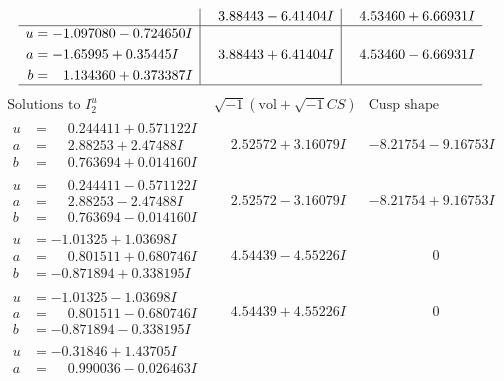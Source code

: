 \documentclass[1p]{elsarticle_modified}
\theoremstyle{definition}
\newcommand{\I}{\sqrt{-1}}
\begin{document}
$$\begin{array}{c|c|c}
 & \phantom{-}3.88443 - 6.41404 I & \phantom{-}4.53460 + 6.66931 I \\ \hline\begin{aligned}
u &= -1.097080 - 0.724650 I \\
a &= -1.65995 + 0.35445 I \\
b &= \phantom{-}1.134360 + 0.373387 I\end{aligned}
 & \phantom{-}3.88443 + 6.41404 I & \phantom{-}4.53460 - 6.66931 I\\
 \hline 
 \end{array}$$\newpage$$\begin{array}{c|c|c}  
\text{Solutions to }I^u_{2}& \I (\text{vol} + \sqrt{-1}CS) & \text{Cusp shape}\\
 \hline 
\begin{aligned}
u &= \phantom{-}0.244411 + 0.571122 I \\
a &= \phantom{-}2.88253 + 2.47488 I \\
b &= \phantom{-}0.763694 + 0.014160 I\end{aligned}
 & \phantom{-}2.52572 + 3.16079 I & -8.21754 - 9.16753 I \\ \hline\begin{aligned}
u &= \phantom{-}0.244411 - 0.571122 I \\
a &= \phantom{-}2.88253 - 2.47488 I \\
b &= \phantom{-}0.763694 - 0.014160 I\end{aligned}
 & \phantom{-}2.52572 - 3.16079 I & -8.21754 + 9.16753 I \\ \hline\begin{aligned}
u &= -1.01325 + 1.03698 I \\
a &= \phantom{-}0.801511 + 0.680746 I \\
b &= -0.871894 + 0.338195 I\end{aligned}
 & \phantom{-}4.54439 - 4.55226 I & \phantom{-0.000000 } 0 \\ \hline\begin{aligned}
u &= -1.01325 - 1.03698 I \\
a &= \phantom{-}0.801511 - 0.680746 I \\
b &= -0.871894 - 0.338195 I\end{aligned}
 & \phantom{-}4.54439 + 4.55226 I & \phantom{-0.000000 } 0 \\ \hline\begin{aligned}
u &= -0.31846 + 1.43705 I \\
a &= \phantom{-}0.990036 - 0.026463 I \\

\end{aligned}
\end{array}$$
\end{document}
